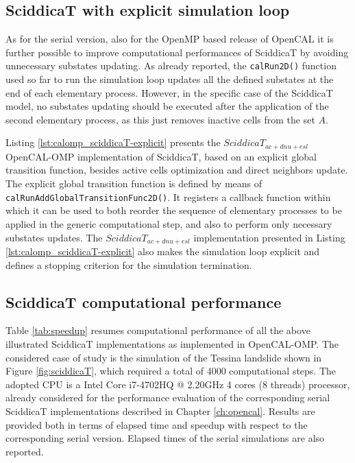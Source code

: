 \subsection{SciddicaT with explicit simulation loop}

As for the serial version, also for the OpenMP based release of
OpenCAL it is further possible to improve computational performances
of SciddicaT by avoiding unnecessary substates updating. As already
reported, the \verb'calRun2D()' function used so far to run the
simulation loop updates all the defined substates at the end of each
elementary process. However, in the specific case of the SciddicaT
model, no substates updating should be executed after the application
of the second elementary process, as this just removes inactive cells
from the set $A$.

Listing \ref{lst:calomp_sciddicaT-explicit} presents the
$SciddicaT_{ac+dnu+esl}$ OpenCAL-OMP implementation of SciddicaT,
based on an explicit global transition function, besides active cells
optimization and direct neighbors update. The explicit global
transition function is defined by means of
\verb'calRunAddGlobalTransitionFunc2D()'. It registers a callback
function within which it can be used to both reorder the sequence of
elementary processes to be applied in the generic computational step,
and also to perform only necessary substates updates. The
$SciddicaT_{ac+dnu+esl}$ implementation presented in Listing
\ref{lst:calomp_sciddicaT-explicit} also makes the simulation loop
explicit and defines a stopping criterion for the simulation
termination.



\subsection{SciddicaT computational performance}

Table \ref{tab:speedup} resumes computational performance of all the
above illustrated SciddicaT implementations as implemented in
OpenCAL-OMP. The considered case of study is the simulation of the
Tessina landslide shown in Figure \ref{fig:sciddicaT}, which required
a total of 4000 computational steps. The adopted CPU is a Intel Core
i7-4702HQ @ 2.20GHz 4 cores (8 threads) processor, already considered
for the performance evaluation of the corresponding serial SciddicaT
implementations described in Chapter \ref{ch:opencal}. Results are
provided both in terms of elapsed time and speedup with respect to
the corresponding serial version. Elapsed times of the serial
simulations are also reported.

